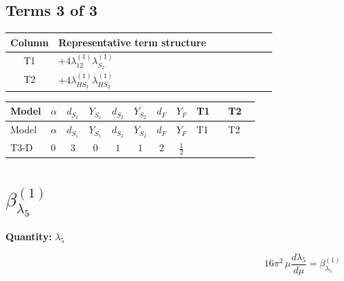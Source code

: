 \documentclass[8pt]{article}
\begin{document}
\begin{landscape}
\subsection*{Terms 3 of 3}
\begin{center}
\begin{tabular}{@{}c >{\raggedright\arraybackslash}p{0.82\linewidth}@{}}
\toprule
Column & Representative term structure \\
\midrule
T1 & \(\displaystyle +4 {\lambda_{12}^{(1)}} {\lambda_{S_2}^{(1)}}\) \\
\midrule
T2 & \(\displaystyle +4 {\lambda_{HS_1}^{(1)}} {\lambda_{HS_2}^{(1)}}\) \\
\midrule
\bottomrule
\end{tabular}
\end{center}
\smallskip
\tiny
\begin{longtable}{@{}llcccccc >{\raggedright\arraybackslash}p{0.21\linewidth} >{\raggedright\arraybackslash}p{0.21\linewidth}@{}}
\toprule
Model & $\alpha$ & $d_{S_1}$ & $Y_{S_1}$ & $d_{S_2}$ & $Y_{S_2}$ & $d_F$ & $Y_F$ & T1 & T2 \\
\midrule
\endfirsthead
\toprule
Model & $\alpha$ & $d_{S_1}$ & $Y_{S_1}$ & $d_{S_2}$ & $Y_{S_2}$ & $d_F$ & $Y_F$ & T1 & T2 \\
\midrule
\endhead
T3-D & $0$ & $3$ & $0$ & $1$ & $1$ & $2$ & $\frac{1}{2}$ & \scriptsize\adjustbox{max width=\linewidth}{$\begin{gathered} +4 {\lambda_{12}^{(1)}} {\lambda_{S_2}^{(1)}}\end{gathered}$} & \scriptsize\adjustbox{max width=\linewidth}{$\begin{gathered} +4 {\lambda_{HS_1}^{(1)}} {\lambda_{HS_2}^{(1)}}\end{gathered}$} \\
\midrule
\bottomrule
\end{longtable}
\clearpage
\section*{$\beta_{\lambda_5}^{(1)}$}
\noindent\textbf{Quantity: }$\lambda_5$\par\smallskip
\[16\pi^2\,\mu\frac{d \lambda_5}{d\mu}=\beta_{\lambda_5}^{(1)}\]

\end{landscape}
\end{document}
